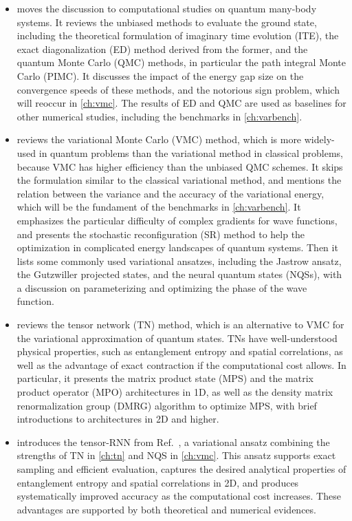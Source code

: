 \begin{itemize}
\item {} moves the discussion to computational studies on quantum many-body systems. It reviews the unbiased methods to evaluate the ground state, including the theoretical formulation of imaginary time evolution (ITE), the exact diagonalization (ED) method derived from the former, and the quantum Monte Carlo (QMC) methods, in particular the path integral Monte Carlo (PIMC).
It discusses the impact of the energy gap size on the convergence speeds of these methods, and the notorious sign problem, which will reoccur in \cref{ch:vmc}.
The results of ED and QMC are used as baselines for other numerical studies, including the benchmarks in \cref{ch:varbench}.
\item {} reviews the variational Monte Carlo (VMC) method, which is more widely-used in quantum problems than the variational method in classical problems, because VMC has higher efficiency than the unbiased QMC schemes.
It skips the formulation similar to the classical variational method, and mentions the relation between the variance and the accuracy of the variational energy, which will be the fundament of the benchmarks in \cref{ch:varbench}.
It emphasizes the particular difficulty of complex gradients for wave functions, and presents the stochastic reconfiguration (SR) method to help the optimization in complicated energy landscapes of quantum systems.
Then it lists some commonly used variational ansatzes, including the Jastrow ansatz, the Gutzwiller projected states, and the neural quantum states (NQSs), with a discussion on parameterizing and optimizing the phase of the wave function.
\item {} reviews the tensor network (TN) method, which is an alternative to VMC for the variational approximation of quantum states. TNs have well-understood physical properties, such as entanglement entropy and spatial correlations, as well as the advantage of exact contraction if the computational cost allows.
In particular, it presents the matrix product state (MPS) and the matrix product operator (MPO) architectures in 1D, as well as the density matrix renormalization group (DMRG) algorithm to optimize MPS, with brief introductions to architectures in 2D and higher.
\item {} introduces the tensor-RNN from Ref.~\cite{wu2023tensor}, a variational ansatz  combining the strengths of TN in \cref{ch:tn} and NQS in \cref{ch:vmc}. This ansatz supports exact sampling and efficient evaluation, captures the desired analytical properties of entanglement entropy and spatial correlations in 2D, and produces systematically improved accuracy as the computational cost increases. These advantages are supported by both theoretical and numerical evidences.

\end{itemize}
